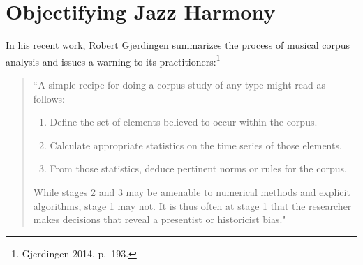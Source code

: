 \chapter{Objectifying Jazz Harmony}


In his recent work, Robert Gjerdingen summarizes the process of musical corpus analysis and issues a warning to its practitioners:\footnote{Gjerdingen 2014, p.\ 193.}
\begin{quote}
``A simple recipe for doing a corpus study of any type
might read as follows:
\begin{enumerate}
	\item Define the set of elements believed to occur within
the corpus.
	\item Calculate appropriate statistics on the time series of
those elements.
	\item From those statistics, deduce pertinent norms or
rules for the corpus.
\end{enumerate}
While stages 2 and 3 may be amenable to numerical
methods and explicit algorithms, stage 1 may not. It is
thus often at stage 1 that the researcher makes decisions
that reveal a presentist or historicist bias."
\end{quote}


